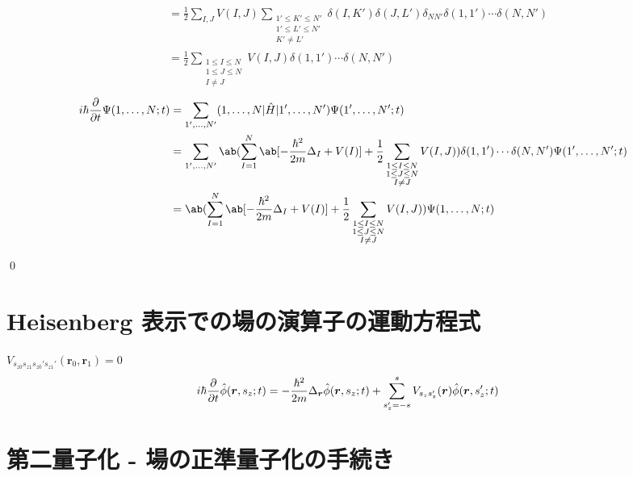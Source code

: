 \documentclass[uplatex,dvipdfmx,a4paper,11pt]{jlreq}
\makeatletter
\newcommand{\rr}{\bm{r}}
\numberwithin{equation}{section}
\theoremstyle{definition}
\renewenvironment{proof}[1][\proofname]{\par
  \normalfont
  \topsep6\p@\@plus6\p@ \trivlist
  \item[\hskip\labelsep{\bfseries #1}\@addpunct{\bfseries}]\ignorespaces\quad\par
}{
  \qed\endtrivlist\@endpefalse
}
\renewcommand\proofname{証明}
\makeatother
\begin{document}
\begin{proof}
\begin{align}
                                                     & = \frac{1}{2}\sum_{I,J}V(I, J)\sum_{\substack{1'\leq K'\leq N'                                              \\ 1'\leq L'\leq N' \\ K' \neq L'}}\delta(I, K')\delta(J, L')\delta_{NN'}\delta(1, 1')\cdots\delta(N, N') \\
                                                     & = \frac{1}{2}\sum_{\substack{1\leq I\leq N                                                                  \\ 1\leq J\leq N \\ I \neq J}}V(I, J)\delta(1, 1')\cdots\delta(N, N')
  \end{align}
  \begin{align}
    i\hbar\diffp{}{t}\Psi(1,\ldots,N; t) & = \sum_{1',\ldots,N'}(1,\ldots,N|\hat{H}|1',\ldots,N')\Psi(1',\ldots,N'; t)                                                   \\
                                         & = \sum_{1',\ldots,N'}\ab(\sum_{I = 1}^{N}\ab[-\frac{\hbar^2}{2m}\Delta_{I} + V(I)] + \frac{1}{2}\sum_{\substack{1\leq I\leq N \\ 1\leq J\leq N \\ I \neq J}}V(I, J))\delta(1, 1')\cdots\delta(N, N')\Psi(1',\ldots,N'; t) \\
                                         & =\ab(\sum_{I = 1}^{N}\ab[-\frac{\hbar^2}{2m}\Delta_{I} + V(I)] + \frac{1}{2}\sum_{\substack{1\leq I\leq N                     \\ 1\leq J\leq N \\ I \neq J}}V(I, J))\Psi(1,\ldots,N; t)
  \end{align}
\end{proof}

\section{Heisenberg 表示での場の演算子の運動方程式}
\begin{theorem}
  $V_{s_{z0}s_{z1}s_{z0}'s_{z1}'}(\rr_0, \rr_1) = 0$
  \begin{align}
    i\hbar\diffp{}{t}\hat{\phi}(\rr, s_z; t) & = -\frac{\hbar^2}{2m}\Delta_{\rr}\hat{\phi}(\rr, s_z; t) + \sum_{s_z' = -s}^{s}V_{s_zs_z'}(\rr)\hat{\phi}(\rr, s_z'; t)
  \end{align}
\end{theorem}

\section{第二量子化 - 場の正準量子化の手続き}
\end{document}
